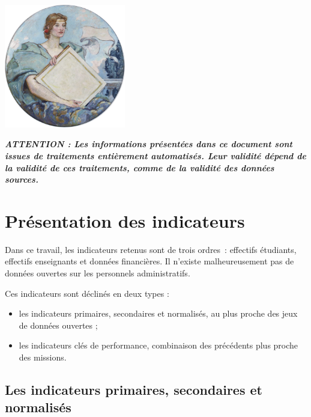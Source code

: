 \documentclass[12pt,french,]{article}
\providecommand{\tightlist}{%
  \setlength{\itemsep}{0pt}\setlength{\parskip}{0pt}}
\begin{document}
\begin{center}\includegraphics[width=200px,height=0.3\textheight]{files/589px-Knowledge-Reid-Highsmith} \end{center}

\textbf{\emph{ATTENTION : Les informations présentées dans ce document
sont issues de traitements entièrement automatisés. Leur validité dépend
de la validité de ces traitements, comme de la validité des données
sources.}}

\newpage
\tableofcontents
\newpage

\hypertarget{pruxe9sentation-des-indicateurs}{%
\section{Présentation des
indicateurs}\label{pruxe9sentation-des-indicateurs}}

Dans ce travail, les indicateurs retenus sont de trois ordres~:
effectifs étudiants, effectifs enseignants et données financières. Il
n'existe malheureusement pas de données ouvertes sur les personnels
administratifs.

Ces indicateurs sont déclinés en deux types :

\begin{itemize}
\tightlist
\item
  les indicateurs primaires, secondaires et normalisés, au plus proche
  des jeux de données ouvertes ;
\item
  les indicateurs clés de performance, combinaison des précédents plus
  proche des missions.
\end{itemize}

\hypertarget{les-indicateurs-primaires-secondaires-et-normalisuxe9s}{%
\subsection{Les indicateurs primaires, secondaires et
normalisés}\label{les-indicateurs-primaires-secondaires-et-normalisuxe9s}}
\end{document}
